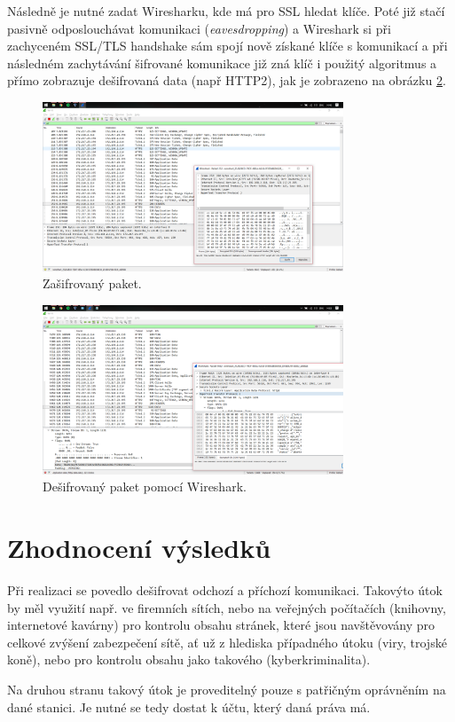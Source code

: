 \documentclass[10pt,a4paper,titlepage]{article}
\begin{document}
  Následně je nutné zadat Wiresharku, kde má pro SSL hledat klíče. Poté již stačí
  pasivně odposlouchávat komunikaci ({\it eavesdropping}) a Wireshark si při zachyceném
  SSL/TLS handshake sám spojí nově získané klíče s komunikací a při následném zachytávání
  šifrované komunikace již zná klíč i použitý algoritmus a přímo zobrazuje dešifrovaná
  data (např HTTP2), jak je zobrazeno na obrázku \ref{fig:decrypted}.

  \begin{figure}[h!]
    \begin{center}
      \includegraphics[width=0.8\textwidth]{encrypted.png}
      \caption{Zašifrovaný paket.\label{fig:encrypted}}
    \end{center}    
  \end{figure}

  \begin{figure}[h!]
    \begin{center}
      \includegraphics[width=0.8\textwidth]{decrypted.png}
      \caption{Dešifrovaný paket pomocí Wireshark.\label{fig:decrypted}}
    \end{center}    
  \end{figure}

  \section*{Zhodnocení výsledků}
  Při realizaci se povedlo dešifrovat odchozí a příchozí komunikaci. Takovýto
  útok by měl využití např. ve firemních sítích, nebo na veřejných počítačích (knihovny,
  internetové kavárny) pro kontrolu obsahu stránek, které jsou navštěvovány pro celkové
  zvýšení zabezpečení sítě, ať už z hlediska případného útoku (viry, trojské koně),
  nebo pro kontrolu obsahu jako takového (kyberkriminalita).

  Na druhou stranu takový útok je proveditelný pouze s patřičným oprávněním na dané stanici.
  Je nutné se tedy dostat k účtu, který daná práva má.
  
  \newpage
  \printbibliography
\end{document}
